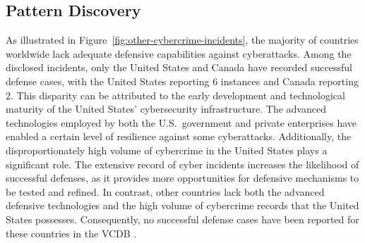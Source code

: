 \subsection{Pattern Discovery}\label{subsec:pattern-discovery} %
	As illustrated in Figure~\ref{fig:other-cybercrime-incidents},
	the majority of countries worldwide lack adequate defensive capabilities against cyberattacks.
	Among the disclosed incidents, only the United States and Canada have recorded successful defense cases,
	with the United States reporting 6 instances and Canada reporting 2.
	This disparity can be attributed to the early development and technological maturity of the United States' cybersecurity infrastructure.
	The advanced technologies employed by both the U.S.\ government and private enterprises have enabled a certain level of resilience against some cyberattacks.
	Additionally, the disproportionately high volume of cybercrime in the United States plays a significant role.
	The extensive record of cyber incidents increases the likelihood of successful defenses,
	as it provides more opportunities for defensive mechanisms to be tested and refined.
	In contrast, other countries lack both the advanced defensive technologies and the high volume of cybercrime records that the United States possesses.
	Consequently, no successful defense cases have been reported for these countries in the VCDB .

